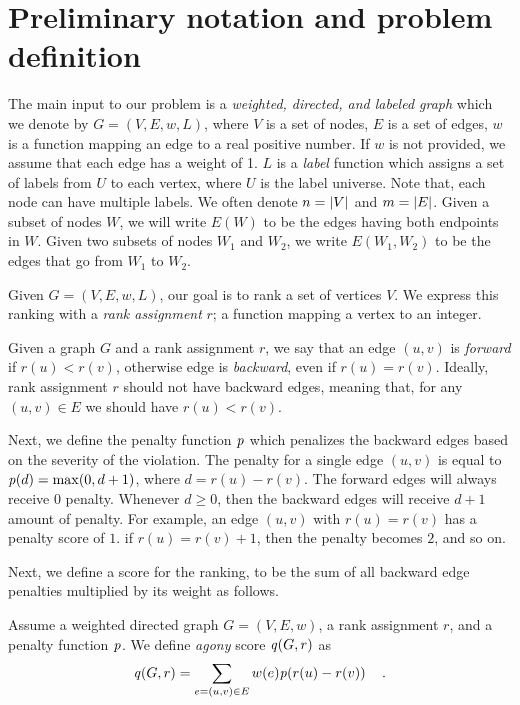\section{Preliminary notation and problem definition}\label{sec:prel}


The main input to our problem is a \emph{weighted, directed, and labeled graph} which we 
denote by $G = (V, E, w, L)$, where $V$ is a set of nodes, $E$ is a set of edges, $w$ is a function mapping an edge to a real
positive number. If $w$ is not provided, we assume that each edge has a weight
of 1. $L$ is a \emph{label} function which assigns a set of labels from $U$ to each vertex, where $U$ is the label universe. Note that, each node can have multiple labels. We  often denote $n = {\left|V\right|}$ and $m = {\left|E\right|}$. Given a subset of nodes $W$, we will write $E(W)$ to be the edges
having both endpoints in $W$. Given two subsets of nodes $W_1$ and $W_2$, we write $E(W_1, W_2)$
to be the edges that go from $W_1$ to $W_2$.

Given $G= (V, E, w, L)$, our goal is to rank a set of vertices $V$.  We
express this ranking with a \emph{rank assignment} $r$; a function
mapping a vertex to an integer. 

Given a graph $G$ and a rank assignment $r$, we  say that an edge
$(u, v)$ is \emph{forward} if $r(u) < r(v)$, otherwise edge is
\emph{backward}, even if $r(u) = r(v)$.
Ideally, rank assignment $r$ should not have backward edges, meaning that, for any
$(u, v) \in E$ we should have $r(u) < r(v)$. 

Next, we define the
penalty function  $\pen{}$ which penalizes the backward edges based on the severity of the violation. The penalty
for a single edge $(u, v)$ is  equal to $\pen{d} = \max(0, d + 1)$, where $d = r(u) - r(v)$. The forward edges will always receive $0$ penalty. Whenever $d \geq 0$, then the backward edges will receive $d+1$ amount of penalty. 
For example, an edge $(u, v)$ with $r(u) = r(v)$ has a penalty score of $1$. if $r(u) = r(v) + 1$, then the penalty becomes  $2$, and so on.

Next, we define a score for the ranking, to be the  sum of all backward edge penalties multiplied by its weight as follows.
\begin{definition}
Assume a weighted directed graph $G = (V, E, w)$, a rank assignment $r$, and a penalty function $\pen{}$.
We define \emph{agony} score $\score{G, r}$ as 
\[
	\score{G, r} = \sum_{e = (u, v) \in E} w(e) \pen{r(u) - r(v)}\quad.
\]
\end{definition}

